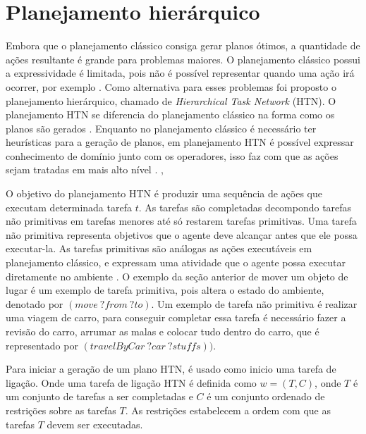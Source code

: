 \section{Planejamento hierárquico} 


Embora que o planejamento clássico consiga gerar planos ótimos, a quantidade de ações resultante é grande para problemas maiores. O planejamento clássico possui a expressividade é limitada, pois não é possível representar quando uma ação irá ocorrer, por exemplo \cite{intelligence2003modern}.
Como alternativa para esses problemas foi proposto o planejamento hierárquico, chamado de \textit{Hierarchical Task Network} (HTN). 
O planejamento HTN se diferencia do planejamento clássico na forma como os planos são gerados \cite{ghallab2004automated}. 
Enquanto no planejamento clássico é necessário ter heurísticas para a geração de planos, em planejamento HTN é possível expressar conhecimento de domínio junto com os operadores, isso faz com que as ações sejam tratadas em mais alto nível \cite{intelligence2003modern}.   , 

O objetivo do planejamento HTN é produzir uma sequência de ações que executam determinada tarefa $t$. 
As tarefas são completadas decompondo tarefas não primitivas em tarefas menores até só restarem tarefas primitivas. 
Uma tarefa não primitiva representa objetivos que o agente deve alcançar antes que ele possa executar-la. 
As tarefas primitivas são análogas as ações executáveis em planejamento clássico, e expressam uma atividade que o agente possa executar diretamente no ambiente \cite{intelligence2003modern}. 
O exemplo da seção anterior de mover um objeto de lugar é um exemplo de tarefa primitiva, pois altera o estado do ambiente, denotado por $(move~ ?from~ ?to)$. 
Um exemplo de tarefa não primitiva é realizar uma viagem de carro, para conseguir completar essa tarefa é necessário fazer a revisão do carro, arrumar as malas e colocar tudo dentro do carro, que é representado por $(travelByCar ~?car~ ?stuffs))$. 

Para iniciar a geração de um plano HTN, é usado como inicio uma tarefa de ligação. 
Onde uma tarefa de ligação HTN é definida como $w = (T, C)$, onde $T$ é um conjunto de tarefas a ser completadas e $C$ é um conjunto ordenado de restrições sobre as tarefas $T$. 
As restrições estabelecem a ordem com que as tarefas $T$ devem ser executadas. 


